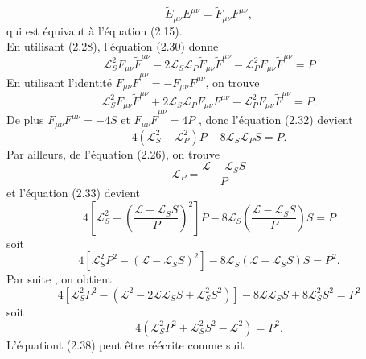 \documentclass[12pt,a4paper, openany]{report}
\begin{document}
	\begin{equation}
		\tilde{E}_{\mu \nu}E^{\mu \nu}=\tilde{F}_{\mu \nu}F^{\mu \nu} ,
	\end{equation}
	qui est équivaut à l'équation (2.15).\\
	En utilisant (2.28), l'équation (2.30) donne 
	\begin{equation}
		\mathcal{L}^2_S F_{\mu \nu}\tilde{F}^{\mu \nu}-2\mathcal{L}_S \mathcal{L}_P \tilde{F}_{\mu \nu}\tilde{F}^{\mu \nu}-\mathcal{L}^2_P F_{\mu \nu}\tilde{F}^{\mu \nu}=P
	\end{equation}
	En utilisant l'identité $\tilde{F}_{\mu \nu}\tilde{F}^{\mu \nu}=-F_{\mu \nu}F^{\mu \nu}$, on trouve 
	\begin{equation}
		\mathcal{L}^2_S F_{\mu \nu}\tilde{F}^{\mu \nu}+2\mathcal{L}_S \mathcal{L}_P F_{\mu \nu}F^{\mu \nu} -\mathcal{L}^2_P F_{\mu \nu}\tilde{F}^{\mu \nu}=P.
	\end{equation}
	De plus $F_{\mu \nu}F^{\mu \nu}=-4S$  et $F_{\mu \nu}\tilde{F}^{\mu \nu}=4P$ , donc l'équation (2.32) devient 
	\begin{equation}
		4\left(\mathcal{L}^2_S-\mathcal{L}^2_P\right)P-8\mathcal{L}_S \mathcal{L}_P S=P.
	\end{equation}
	Par ailleurs, de l'équation (2.26), on trouve 
	\begin{equation}
		\mathcal{L}_P=\frac{\mathcal{L}-\mathcal{L}_S S}{P}	
	\end{equation}
	et l'équation (2.33) devient 
	\begin{equation}
		4\left[\mathcal{L}^2_S-\left(\frac{\mathcal{L}-\mathcal{L}_S S}{P}\right)^2 \right]P-8\mathcal{L}_S\left(\frac{\mathcal{L}-\mathcal{L}_S S}{P}\right)S=P
	\end{equation} 
	soit
	\begin{equation}
		4\left[\mathcal{L}^2_S P^2-\left(\mathcal{L}-\mathcal{L}_S S\right)^2 \right]-8\mathcal{L}_S\left(\mathcal{L}-\mathcal{L}_S S \right)S=P^2.
	\end{equation}
	Par suite , on obtient 
	\begin{equation}
		4\left[\mathcal{L}^2_S P^2-\left(\mathcal{L}^2-2\mathcal{L}\mathcal{L}_S S+\mathcal{L}^2_S S^2\right) \right]-8\mathcal{L}\mathcal{L}_S S+8\mathcal{L}^2_S S^2=P^2
	\end{equation}
	soit 
	\begin{equation}
		4\left(\mathcal{L}^2_S P^2+\mathcal{L}^2_S S^2-\mathcal{L}^2\right)=P^2	.
	\end{equation}
	L'équationt (2.38) peut \^{e}tre réécrite comme suit 
\end{document}
